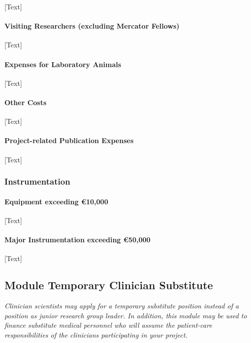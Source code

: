 \documentclass[11pt]{article} %
\begin{document}
[Text]

\paragraph{Visiting Researchers (excluding Mercator Fellows)}

[Text]

\paragraph{Expenses for Laboratory Animals}

[Text]

\paragraph{Other Costs}

[Text]

\paragraph{Project-related Publication Expenses} 

[Text]

\subsubsection{Instrumentation}

\paragraph{Equipment exceeding \euro 10,000}

[Text]

\paragraph{ Major Instrumentation exceeding \euro 50,000 }

[Text]

\subsection{ Module Temporary Clinician Substitute}
\textit{Clinician scientists may apply for a temporary substitute position instead of a position as junior research group leader. In addition, this module may be used to finance substitute medical personnel who will assume the patient-care responsibilities of the clinicians participating in your project.}
\end{document}
